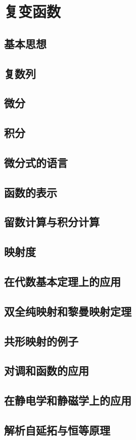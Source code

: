 \chapter{复变函数}
\section{基本思想}
\section{复数列}
\section{微分}
\section{积分}
\section{微分式的语言}
\section{函数的表示}
\section{留数计算与积分计算}
\section{映射度}
\section{在代数基本定理上的应用}
\section{双全纯映射和黎曼映射定理}
\section{共形映射的例子}
\section{对调和函数的应用}
\section{在静电学和静磁学上的应用}
\section{解析自延拓与恒等原理}
